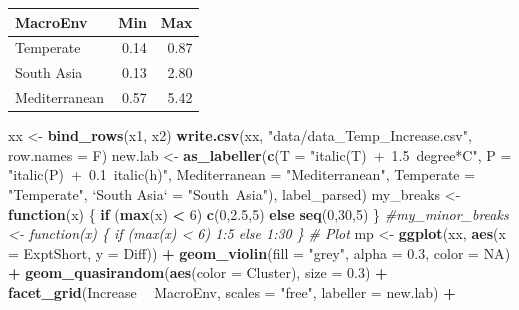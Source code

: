 \documentclass[
]{article}
\newenvironment{Shaded}{\begin{snugshade}}{\end{snugshade}}
\newcommand{\CommentTok}[1]{\textcolor[rgb]{0.56,0.35,0.01}{\textit{#1}}}
\newcommand{\ControlFlowTok}[1]{\textcolor[rgb]{0.13,0.29,0.53}{\textbf{#1}}}
\newcommand{\DataTypeTok}[1]{\textcolor[rgb]{0.13,0.29,0.53}{#1}}
\newcommand{\DecValTok}[1]{\textcolor[rgb]{0.00,0.00,0.81}{#1}}
\newcommand{\FloatTok}[1]{\textcolor[rgb]{0.00,0.00,0.81}{#1}}
\newcommand{\KeywordTok}[1]{\textcolor[rgb]{0.13,0.29,0.53}{\textbf{#1}}}
\newcommand{\NormalTok}[1]{#1}
\newcommand{\OperatorTok}[1]{\textcolor[rgb]{0.81,0.36,0.00}{\textbf{#1}}}
\newcommand{\OtherTok}[1]{\textcolor[rgb]{0.56,0.35,0.01}{#1}}
\newcommand{\StringTok}[1]{\textcolor[rgb]{0.31,0.60,0.02}{#1}}
\begin{document}
\begin{longtable}[]{@{}lrr@{}}
\toprule
MacroEnv & Min & Max\tabularnewline
\midrule
\endhead
Temperate & 0.14 & 0.87\tabularnewline
South Asia & 0.13 & 2.80\tabularnewline
Mediterranean & 0.57 & 5.42\tabularnewline
\bottomrule
\end{longtable}

\begin{Shaded}
\begin{Highlighting}[]
\NormalTok{xx <-}\StringTok{ }\KeywordTok{bind_rows}\NormalTok{(x1, x2)}
\KeywordTok{write.csv}\NormalTok{(xx, }\StringTok{"data/data_Temp_Increase.csv"}\NormalTok{, }\DataTypeTok{row.names =}\NormalTok{ F)}
\NormalTok{new.lab <-}\StringTok{ }\KeywordTok{as_labeller}\NormalTok{(}\KeywordTok{c}\NormalTok{(}\DataTypeTok{T =} \StringTok{"italic(T)~+~1.5~degree*C"}\NormalTok{, }\DataTypeTok{P =} \StringTok{"italic(P)~+~0.1~italic(h)"}\NormalTok{,}
    \DataTypeTok{Mediterranean =} \StringTok{"Mediterranean"}\NormalTok{, }\DataTypeTok{Temperate =} \StringTok{"Temperate"}\NormalTok{, }
    \StringTok{`}\DataTypeTok{South Asia}\StringTok{`}\NormalTok{ =}\StringTok{ "South~Asia"}\NormalTok{), label_parsed)}
\NormalTok{my_breaks <-}\StringTok{ }\ControlFlowTok{function}\NormalTok{(x) \{ }\ControlFlowTok{if}\NormalTok{ (}\KeywordTok{max}\NormalTok{(x) }\OperatorTok{<}\StringTok{ }\DecValTok{6}\NormalTok{) }\KeywordTok{c}\NormalTok{(}\DecValTok{0}\NormalTok{,}\FloatTok{2.5}\NormalTok{,}\DecValTok{5}\NormalTok{) }\ControlFlowTok{else} \KeywordTok{seq}\NormalTok{(}\DecValTok{0}\NormalTok{,}\DecValTok{30}\NormalTok{,}\DecValTok{5}\NormalTok{) \}}
\CommentTok{#my_minor_breaks <- function(x) \{ if (max(x) < 6) 1:5 else 1:30 \}}
\CommentTok{# Plot }
\NormalTok{mp <-}\StringTok{ }\KeywordTok{ggplot}\NormalTok{(xx, }\KeywordTok{aes}\NormalTok{(}\DataTypeTok{x =}\NormalTok{ ExptShort, }\DataTypeTok{y =}\NormalTok{ Diff)) }\OperatorTok{+}\StringTok{ }
\StringTok{  }\KeywordTok{geom_violin}\NormalTok{(}\DataTypeTok{fill =} \StringTok{"grey"}\NormalTok{, }\DataTypeTok{alpha =} \FloatTok{0.3}\NormalTok{, }\DataTypeTok{color =} \OtherTok{NA}\NormalTok{) }\OperatorTok{+}\StringTok{ }
\StringTok{  }\KeywordTok{geom_quasirandom}\NormalTok{(}\KeywordTok{aes}\NormalTok{(}\DataTypeTok{color =}\NormalTok{ Cluster), }\DataTypeTok{size =} \FloatTok{0.3}\NormalTok{) }\OperatorTok{+}\StringTok{ }
\StringTok{  }\KeywordTok{facet_grid}\NormalTok{(Increase }\OperatorTok{~}\StringTok{ }\NormalTok{MacroEnv, }\DataTypeTok{scales =} \StringTok{"free"}\NormalTok{, }\DataTypeTok{labeller =}\NormalTok{ new.lab) }\OperatorTok{+}\StringTok{ }

\end{Highlighting}
\end{Shaded}
\end{document}
